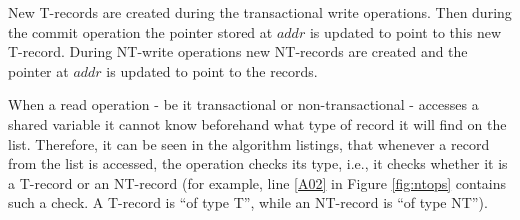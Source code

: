 \documentclass[11pt,letterpaper]{article}
\begin{document}
New T-records are created during the transactional write operations.
Then during
the commit operation the pointer stored at $\mathit{addr}$ is updated to point to this new T-record.
During NT-write operations new NT-records are created and the pointer at $\mathit{addr}$
is updated to point to the records.

When a read operation - be it transactional or non-transactional - accesses 
a shared variable it cannot know beforehand what type of record it will find 
on the list. Therefore, it can be seen in the algorithm listings, that whenever 
a record from the list is accessed, 
the operation checks its type, i.e., it checks 
whether it is a T-record or an NT-record (for example, line \ref{A02} in Figure 
\ref{fig:ntops} contains such a check. A T-record is {}``of type T'', while an 
NT-record is {}``of type NT''). 
\end{document}
